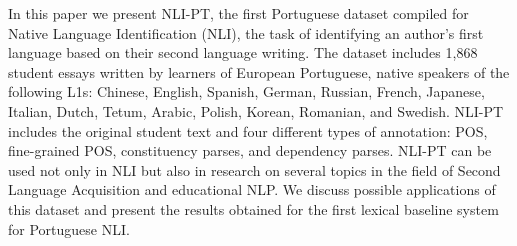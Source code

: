 In this paper we present NLI-PT, the first Portuguese dataset compiled for Native Language Identification (NLI), the task of identifying an author's first language based on their second language writing. The dataset includes 1,868 student essays written by learners of European Portuguese, native speakers of the following L1s: Chinese, English, Spanish, German, Russian, French, Japanese, Italian, Dutch, Tetum, Arabic, Polish, Korean, Romanian, and Swedish. NLI-PT includes the original student text and four different types of annotation: POS, fine-grained POS, constituency parses, and dependency parses. NLI-PT can be used not only in NLI but also in research on several topics in the field of Second Language Acquisition and educational NLP. We discuss possible applications of this dataset and present the results obtained for the first lexical baseline system for Portuguese NLI.
